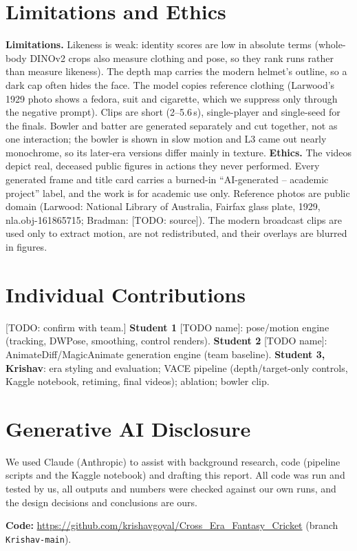\documentclass[10pt,twocolumn]{article}
\begin{document}
\section{Limitations and Ethics}
\textbf{Limitations.} Likeness is weak: identity scores are low in absolute terms (whole-body DINOv2 crops also measure
clothing and pose, so they rank runs rather than measure likeness). The depth map carries the modern helmet's outline,
so a dark cap often hides the face. The model copies reference clothing (Larwood's 1929 photo shows a fedora, suit and
cigarette, which we suppress only through the negative prompt). Clips are short (2--5.6\,s), single-player and
single-seed for the finals. Bowler and batter are generated separately and cut together, not as one interaction; the bowler is shown in
slow motion and L3 came out nearly monochrome, so its later-era versions differ mainly in texture.
\textbf{Ethics.} The videos depict real, deceased public figures in actions they never performed. Every generated frame
and title card carries a burned-in ``AI-generated -- academic project'' label, and the work is for academic use only.
Reference photos are public domain (Larwood: National Library of Australia, Fairfax glass plate, 1929,
nla.obj-161865715; Bradman: [TODO: source]). The modern broadcast clips are used only to extract motion, are not
redistributed, and their overlays are blurred in figures.

\section{Individual Contributions}
[TODO: confirm with team.] \textbf{Student 1} [TODO name]: pose/motion engine (tracking, DWPose, smoothing, control
renders). \textbf{Student 2} [TODO name]: AnimateDiff/MagicAnimate generation engine (team baseline).
\textbf{Student 3, Krishav}: era styling and evaluation; VACE pipeline (depth/target-only controls, Kaggle notebook,
retiming, final videos); ablation; bowler clip.

\section{Generative AI Disclosure}
We used Claude (Anthropic) to assist with background research, code (pipeline scripts and the Kaggle notebook) and
drafting this report. All code was run and tested by us, all outputs and numbers were checked against our own runs, and
the design decisions and conclusions are ours.

\textbf{Code:} \url{https://github.com/krishavgoyal/Cross_Era_Fantasy_Cricket} (branch \texttt{Krishav-main}).

\small


\end{document}
